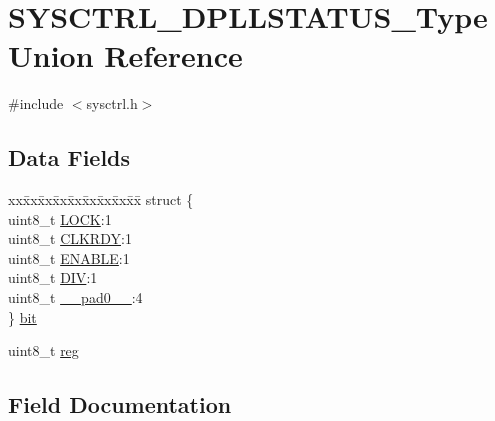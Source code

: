 \hypertarget{union_s_y_s_c_t_r_l___d_p_l_l_s_t_a_t_u_s___type}{}\section{S\+Y\+S\+C\+T\+R\+L\+\_\+\+D\+P\+L\+L\+S\+T\+A\+T\+U\+S\+\_\+\+Type Union Reference}
\label{union_s_y_s_c_t_r_l___d_p_l_l_s_t_a_t_u_s___type}


{\ttfamily \#include $<$sysctrl.\+h$>$}

\subsection*{Data Fields}
\begin{DoxyCompactItemize}
\item 
\begin{tabbing}
xx\=xx\=xx\=xx\=xx\=xx\=xx\=xx\=xx\=\kill
struct \{\\
\>uint8\_t \mbox{\hyperlink{union_s_y_s_c_t_r_l___d_p_l_l_s_t_a_t_u_s___type_a4cf8c8b42c7b154ce36d4bb9723e01d1}{LOCK}}:1\\
\>uint8\_t \mbox{\hyperlink{union_s_y_s_c_t_r_l___d_p_l_l_s_t_a_t_u_s___type_a4bfd4f7bd90227a3c51ed1b279b94b92}{CLKRDY}}:1\\
\>uint8\_t \mbox{\hyperlink{union_s_y_s_c_t_r_l___d_p_l_l_s_t_a_t_u_s___type_a2b3662f1b123463ae1a23c1f324e5cc5}{ENABLE}}:1\\
\>uint8\_t \mbox{\hyperlink{union_s_y_s_c_t_r_l___d_p_l_l_s_t_a_t_u_s___type_aa2c865a3453e463499b654276a70e572}{DIV}}:1\\
\>uint8\_t \mbox{\hyperlink{union_s_y_s_c_t_r_l___d_p_l_l_s_t_a_t_u_s___type_a8b4eebe79ded0459acec2f4950102ba3}{\_\_pad0\_\_}}:4\\
\} \mbox{\hyperlink{union_s_y_s_c_t_r_l___d_p_l_l_s_t_a_t_u_s___type_a5dd3fac3ce3e0a869d1d521532debff0}{bit}}\\

\end{tabbing}\item 
uint8\+\_\+t \mbox{\hyperlink{union_s_y_s_c_t_r_l___d_p_l_l_s_t_a_t_u_s___type_a9428adc9af4653a2050e2536b55dec8d}{reg}}
\end{DoxyCompactItemize}


\subsection{Field Documentation}
\mbox{\label{union_s_y_s_c_t_r_l___d_p_l_l_s_t_a_t_u_s___type_a8b4eebe79ded0459acec2f4950102ba3}} 
